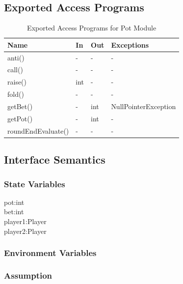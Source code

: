 \documentclass[11pt]{article}
\begin{document}
    \subsection{Exported Access Programs}
    \begin{table}[h]
    \caption{Exported Access Programs for Pot Module}
    \begin{tabular}{p{4cm}p{2cm}p{2cm}p{4cm}}
    Name & In & Out & Exceptions\\
    \hline
    anti() & - & - & -\\
    \hline
    call() & - & - & -\\
    \hline
    raise() & int & - & -\\
    \hline
    fold() & - & - & - \\
    \hline
    getBet() & - & int & NullPointerException\\
    \hline
    getPot() & - & int & -\\
    \hline
    roundEndEvaluate() & - & - & - \\
    \hline
    \end{tabular}
    \end{table}
    \subsection{Interface Semantics}
    \subsubsection{State Variables}
    pot:int\\
    bet:int\\
    player1:Player\\
    player2:Player
    \subsubsection{Environment Variables}
    \subsubsection{Assumption}
\end{document}
